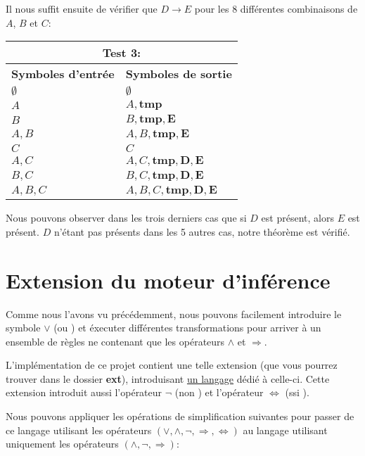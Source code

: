 \documentclass[12pt]{article}
\begin{document}
Il nous suffit ensuite de vérifier que $D \rightarrow E$ pour les 8 différentes combinaisons de $A$, $B$ et $C$:

\begin{tabular}{|p{4cm}|p{6.5cm}|}
  \hline
  \multicolumn{2}{|c|}{\textbf{Test 3:}} \\
  \hline
  \textbf{Symboles d'entrée} & \textbf{Symboles de sortie} \\
  \hline
  $\emptyset$ & $\emptyset$ \\
  \hline
  $A$ & $A, \mathbf{tmp}$ \\
  \hline
  $B$ & $B, \mathbf{tmp}, \mathbf{E}$ \\
  \hline
  $A, B$ & $A, B, \mathbf{tmp}, \mathbf{E}$ \\
  \hline
  $C$ & $C$ \\
  \hline
  $A, C$ & $A, C, \mathbf{tmp}, \mathbf{D}, \mathbf{E}$ \\
  \hline
  $B, C$ & $B, C, \mathbf{tmp}, \mathbf{D}, \mathbf{E}$ \\
  \hline
  $A, B, C$ & $A, B, C, \mathbf{tmp}, \mathbf{D}, \mathbf{E}$ \\
  \hline
\end{tabular}

Nous pouvons observer dans les trois derniers cas que si $D$ est présent, alors $E$ est présent.
$D$ n'étant pas présents dans les 5 autres cas, notre théorème est vérifié.

\section{Extension du moteur d'inférence}

Comme nous l'avons vu précédemment, nous pouvons facilement introduire le symbole $\lor$ (\og ou \fg) et éxecuter différentes transformations pour arriver à un ensemble de règles ne contenant que les opérateurs $\land$ et $\Rightarrow$.

L'implémentation de ce projet contient une telle extension (que vous pourrez trouver dans le dossier \textbf{ext}), introduisant \href{https://github.com/adri326/lo21-project/blob/main/ext/grammar.ebnf}{un langage} dédié à celle-ci.
Cette extension introduit aussi l'opérateur $\neg$ (\og non \fg) et l'opérateur $\Leftrightarrow$ (\og ssi \fg).

Nous pouvons appliquer les opérations de simplification suivantes pour passer de ce langage utilisant les opérateurs \((\lor, \land, \neg, \Rightarrow, \Leftrightarrow)\) au langage utilisant uniquement les opérateurs \((\land, \neg, \Rightarrow)\):
\end{document}
